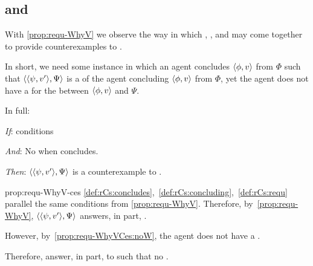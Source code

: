 \subsection{ and \issueConstraint{}}
\label{cha:binding:sec:requ-iC}

\begin{note}
  With \autoref{prop:requ-WhyV} we observe the way in which , , and  may come together to provide counterexamples to \issueConstraint{}.

  In short, we need some instance in which an agent concludes \(\langle \phi, v \rangle\) from \(\Phi\) such that \(\langle \langle \psi, v' \rangle, \Psi \rangle\) is a \requ{} of the agent concluding \(\langle \phi, v \rangle\) from \(\Phi\), yet the agent does not have a \wit{} for the \ros{} between \(\langle \phi, v \rangle\) and \(\Psi\).

  In full:

  \begin{proposition}
    \label{prop:requ-WhyV-ces}

    \begin{itenum}
    \item[\emph{If}:]
       conditions
    \item[\emph{And}:]
      \label{prop:requ-WhyVCes:noW}
      No \wit{} when concludes.
    \item[\emph{Then}:]
      \(\langle \langle \psi, v' \rangle, \Psi \rangle\) is a counterexample to \issueConstraint{}.
    \end{itenum}
    \vspace{-\baselineskip}
  \end{proposition}

  \begin{argument}{prop:requ-WhyV-ces}
    \ref{def:rCs:concludes},~\ref{def:rCs:concluding},~\ref{def:rCs:requ} parallel the same conditions from \autoref{prop:requ-WhyV}.
    Therefore, by~\autoref{prop:requ-WhyV}, \(\langle \langle \psi, v' \rangle, \Psi \rangle\) answers, in part, \qWhyV{}.

    However, by~\ref{prop:requ-WhyVCes:noW}, the agent does not have a \wit{}.

    Therefore, answer, in part, to \qWhyV{} such that no \wit{}.
  \end{argument}
\end{note}

